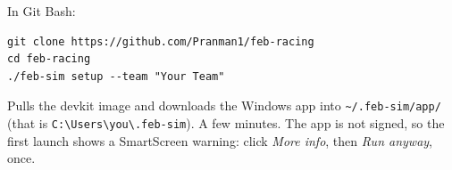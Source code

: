In Git Bash:

\begin{lstlisting}
git clone https://github.com/Pranman1/feb-racing
cd feb-racing
./feb-sim setup --team "Your Team"
\end{lstlisting}

Pulls the devkit image and downloads the Windows app into \texttt{\textasciitilde/.feb-sim/app/}
(that is \texttt{C:\textbackslash Users\textbackslash you\textbackslash.feb-sim}). A few minutes.
The app is not signed, so the first launch shows a SmartScreen warning: click \emph{More info},
then \emph{Run anyway}, once.

